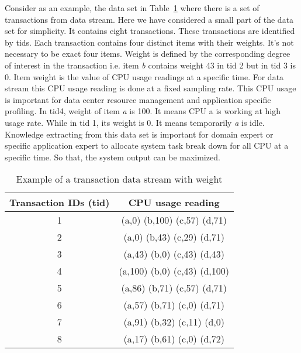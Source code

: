 Consider as an example, the data set in Table~\ref{tab:Table} where there is a set of transactions from data stream. Here we have considered a small part of the data set for simplicity. It contains eight transactions. These transactions are identified by tids. Each transaction contains four distinct items with their weights. It’s not necessary to be exact four items. Weight is defined by the corresponding degree of interest in the transaction i.e. item {\it b} contains weight 43 in tid 2 but in tid 3 is 0. Item weight is the value of CPU usage readings at a specific time. For data stream this CPU usage reading is done at a fixed sampling rate. This CPU usage is important for data center resource management and application specific profiling. In tid4, weight of item {\it a} is 100. It means CPU a is working at high usage rate. While in tid 1, its weight is 0. It means temporarily {\it a} is idle. Knowledge extracting from this data set is important for domain expert or specific application expert to allocate system task break down for all CPU at a specific time.  So that, the system output can be maximized.
%

\begin{table}
\begin{center}
\begin{tabular}{ |c|c| } 
\hline
Transaction IDs (tid) & CPU usage reading \\
\hline
1 & (a,0) (b,100) (c,57) (d,71)\\
2 & (a,0) (b,43) (c,29) (d,71)\\
3 & (a,43) (b,0) (c,43) (d,43)\\
4 & (a,100) (b,0) (c,43) (d,100)\\
5 & (a,86) (b,71) (c,57) (d,71)\\
6 & (a,57) (b,71) (c,0) (d,71)\\
7 & (a,91) (b,32) (c,11) (d,0)\\
8 & (a,17) (b,61) (c,0) (d,72)\\
\hline
\end{tabular}
\caption{Example of a transaction data stream with weight}
\label{tab:Table}
\end{center}
\end{table}





%


